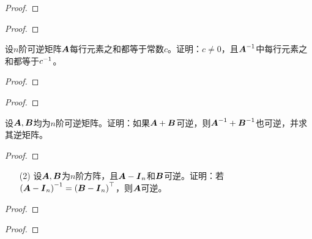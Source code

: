 \begin{problem}

\end{problem}
\begin{proof}

\end{proof}

\begin{problem}

\end{problem}
\begin{proof}

\end{proof}

\begin{problem}
设\(n\)阶可逆矩阵\(\boldsymbol{A}\)每行元素之和都等于常数\(c\)。证明：\(c\neq0\)，且\({\boldsymbol{A}}^{-1}\)中每行元素之和都等于\({c}^{-1}\)。
\end{problem}
\begin{proof}

\end{proof}

\begin{problem}

\end{problem}
\begin{proof}

\end{proof}

\begin{problem}
设\(\boldsymbol{A},\boldsymbol{B}\)均为\(n\)阶可逆矩阵。证明：如果\(\boldsymbol{A}+\boldsymbol{B}\)可逆，则\({\boldsymbol{A}}^{-1}+{\boldsymbol{B}}^{-1}\)也可逆，并求其逆矩阵。
\end{problem}
\begin{proof}

\end{proof}

\begin{problem}
\begin{enumerate}
    \item[(2)]
        {
        设\(\boldsymbol{A},\boldsymbol{B}\)为\(n\)阶方阵，且\(\boldsymbol{A}-\boldsymbol{I}_n\)和\(\boldsymbol{B}\)可逆。证明：若\({\left( \boldsymbol{A}-\boldsymbol{I}_n \right)}^{-1}=\left( \boldsymbol{B}-\boldsymbol{I}_n \right)^\top\)，则\(\boldsymbol{A}\)可逆。
        }
\end{enumerate}
\end{problem}
\begin{proof}

\end{proof}

\begin{problem}

\end{problem}
\begin{proof}

\end{proof}

